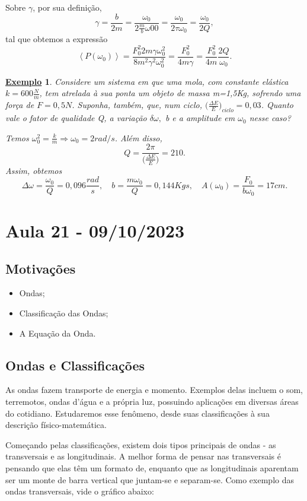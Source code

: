 \documentclass{article}
\newtheorem{example}{\underline{Exemplo}}
\begin{document}
  Sobre \(\gamma \), por sua definição, 
    \[
      \gamma = \frac{b}{2m} = \frac{\omega_{0}}{2\frac{m}{b}\omega 00} = \frac{\omega_{0}}{2\tau \omega_{0}} = \frac{\omega_{0}}{2Q},
    \]
tal que obtemos a expressão
  \[
    \left< P(\omega_{0}) \right> = \frac{F_{0}^{2}2m\gamma \omega_{0}^{2}}{8m^{2}\gamma^{2}\omega_{0}^{2}} = \frac{F_{0}^{2}}{4m\gamma } = \frac{F_{0}^{2}}{4m}\frac{2Q}{\omega_{0}}.
  \]
 \begin{example}
   Considere um sistema em que uma mola, com constante elástica \(k = 600 \frac{N}{m}\), tem atrelada à sua ponta um objeto de massa m=1,5Kg, sofrendo uma força de
 \(F=0,5N\). Suponha, também, que, num ciclo, \(\biggl(\frac{\Delta E}{E}\biggr)_{ciclo}=0,03\). Quanto vale o fator de qualidade Q, a variação \(\delta \omega ,\) b e a amplitude em \(\omega_{0}\) nesse caso?

  Temos \(\omega_{0}^{2} = \frac{k}{m} \Rightarrow \omega_{0} = 2rad/s\). Além disso, 
    \[
      Q = \frac{2\pi }{\biggl(\frac{\Delta E}{E}\biggr)} = 210.      
    \]
Assim, obtemos 
  \[
    \Delta \omega  = \frac{\omega_{0}}{Q} = 0,096\frac{rad}{s},\quad b = \frac{m\omega_{0}}{Q} = 0,144 Kg\dot{}s,\quad A(\omega_{0}) = \frac{F_{0}}{b\omega_{0}} =17cm.
  \]
 \end{example}
\newpage

\section{Aula 21 - 09/10/2023} 
\subsection{Motivações}
\begin{itemize}
  \item Ondas;
  \item Classificação das Ondas;
  \item A Equação da Onda.
\end{itemize}
\subsection{Ondas e Classificações}
  As ondas fazem transporte de energia e momento. Exemplos delas incluem o som, terremotos,
ondas d'água e a própria luz, possuindo aplicações em diversas áreas do cotidiano. Estudaremos
esse fenômeno, desde suas classificações à sua descrição físico-matemática.

  Começando pelas classificações, existem dois tipos principais de ondas - as transversais e as longitudinais.
A melhor forma de pensar nas transversais é pensando que elas têm um formato de, enquanto que as longitudinais
aparentam ser um monte de barra vertical que juntam-se e separam-se. Como exemplo
das ondas transversais, vide o gráfico abaixo:
\end{document}
